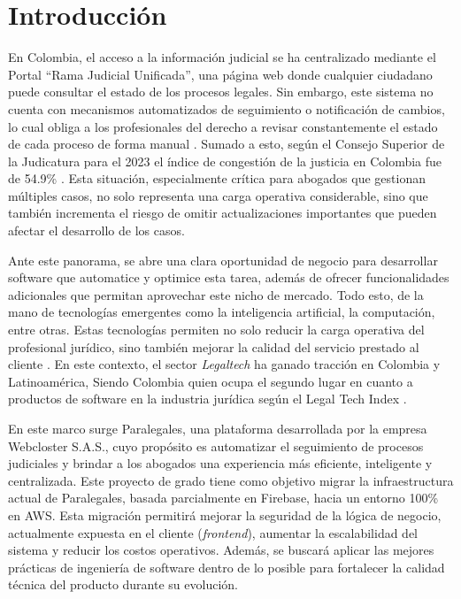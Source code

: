 \section{Introducción}

En Colombia, el acceso a la información judicial se ha centralizado mediante el Portal  “Rama Judicial Unificada”, una página web donde cualquier ciudadano puede consultar el estado de los procesos legales. Sin embargo, este sistema no cuenta con mecanismos automatizados de seguimiento o notificación de cambios, lo cual obliga a los profesionales del derecho a revisar constantemente el estado de cada proceso de forma manual \cite{Paez2024}. Sumado a esto,  según el Consejo Superior de la Judicatura para el 2023 el índice de congestión de la justicia en Colombia fue de 54.9\% \cite{Rozo2024}. Esta situación, especialmente crítica para abogados que gestionan múltiples casos, no solo representa una carga operativa considerable, sino que también incrementa el riesgo de omitir actualizaciones importantes que pueden afectar el desarrollo de los casos.

Ante este panorama, se abre una clara oportunidad de negocio para desarrollar software que automatice y optimice esta tarea, además de ofrecer funcionalidades adicionales que permitan aprovechar este nicho de mercado. Todo esto, de la mano de tecnologías emergentes como la inteligencia artificial, la computación, entre otras. Estas tecnologías permiten no solo reducir la carga operativa del profesional jurídico, sino también mejorar la calidad del servicio prestado al cliente \cite{Botero2023}. En este contexto, el sector \textit{Legaltech} ha ganado tracción en Colombia y Latinoamérica, Siendo Colombia quien ocupa el segundo lugar en cuanto a productos de software en la industria jurídica según el Legal Tech Index \cite{Sierra2023}.

En este marco surge Paralegales, una plataforma desarrollada por la empresa Webcloster S.A.S., cuyo propósito es automatizar el seguimiento de procesos judiciales y brindar a los abogados una experiencia más eficiente, inteligente y centralizada. Este proyecto de grado tiene como objetivo migrar la infraestructura actual de Paralegales, basada parcialmente en Firebase, hacia un entorno 100\% en AWS. Esta migración permitirá mejorar la seguridad de la lógica de negocio, actualmente expuesta en el cliente (\textit{frontend}), aumentar la escalabilidad del sistema y reducir los costos operativos. Además, se buscará aplicar las mejores prácticas de ingeniería de software dentro de lo posible para fortalecer la calidad técnica del producto durante su evolución.
